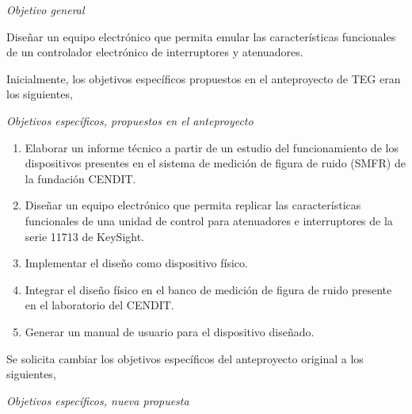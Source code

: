 \documentclass[paper=letter,oneside,fontsize=12pt, parskip=full]{article}
\begin{document}
	\emph{Objetivo general}
	
	\hfill%
	\begin{minipage}{0.95\textwidth}
		Diseñar un equipo electrónico que permita emular las características funcionales de un controlador electrónico de interruptores y atenuadores.
	\end{minipage}
	
	Inicialmente, los objetivos específicos propuestos en el anteproyecto de TEG eran los siguientes,
	
	\emph{Objetivos específicos, propuestos en el anteproyecto}
	
	\begin{enumerate}
		\item Elaborar un informe técnico a partir de un estudio del funcionamiento de los dispositivos presentes en el sistema de medición de figura de ruido (SMFR) de la fundación CENDIT.
		
		\item Diseñar un equipo electrónico que permita replicar las características funcionales de	una unidad de control para atenuadores e interruptores de la serie 11713 de KeySight.
		
		\item Implementar el diseño como dispositivo físico.
		
		\item Integrar el diseño físico en el banco de medición de figura de ruido presente en el laboratorio del CENDIT.
		
		\item Generar un manual de usuario para el dispositivo diseñado.
	\end{enumerate}	
	
	Se solicita cambiar los objetivos específicos del anteproyecto original a los siguientes,	
	
	\emph{Objetivos específicos, nueva propuesta}
		
\end{document}
